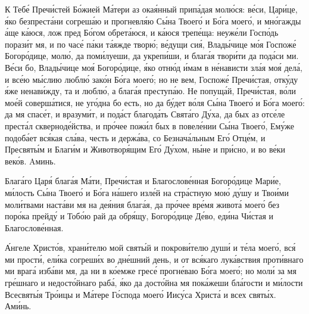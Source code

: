 \begin{mymulticols}
К Теб\'{е} Преч\'{и}стей Б\'{о}жией М\'{а}тери аз ока\'{я}нный прип\'{а}дая мол\'{ю}ся: в\'{е}си, Цар\'{и}це, \'{я}ко безпрест\'{а}ни согреш\'{а}ю и прогневл\'{я}ю С\'{ы}на Твоег\'{о} и Б\'{о}га моег\'{о}, и мн\'{о}гажды \'{а}ще к\'{а}юся, лож пред Б\'{о}гом обрет\'{а}юся, и к\'{а}юся треп\'{е}ща: неуж\'{е}ли Госп\'{о}дь пораз\'{и}т мя, и по час\'{е} п\'{а}ки т\'{а}яжде твор\'{ю}; в\'{е}дущи си\'{я}, Влад\'{ы}чице м\'{о}я Госпож\'{е} Богор\'{о}дице, мол\'{ю}, да пом\'{и}луеши, да укреп\'{и}ши, и благ\'{а}я твор\'{и}ти да под\'{а}си ми. В\'{е}си бо, Влад\'{ы}чице мо\'{я} Богор\'{о}дице, \'{я}ко отн\'{ю}д \'{и}мам в н\'{е}нависти зл\'{а}я мо\'{я} дел\'{а}, и вс\'{е}ю м\'{ы}слию любл\'{ю} зак\'{о}н Б\'{о}га моег\'{о}; но не вем, Госпож\'{е} Преч\'{и}стая, отк\'{у}ду \'{я}же ненав\'{и}жду, та и любл\'{ю}, а благ\'{а}я преступ\'{а}ю. Не попущ\'{а}й, Преч\'{и}стая, в\'{о}ли мо\'{е}й соверш\'{а}тися, не уг\'{о}дна бо есть, но да б\'{у}дет в\'{о}ля С\'{ы}на Твоег\'{о} и Б\'{о}га моег\'{о}: да мя спас\'{е}т, и вразум\'{и}т, и под\'{а}ст благод\'{а}ть Свят\'{а}го Д\'{у}ха, да бых аз отс\'{е}ле прест\'{а}л сквернод\'{е}йства, и пр\'{о}чее пож\'{и}л бых в повел\'{е}нии С\'{ы}на Твоег\'{о}, Ем\'{у}же подоб\'{а}ет вс\'{я}кая сл\'{а}ва, честь и держ\'{а}ва, со Безнач\'{а}льным Ег\'{о} Отц\'{е}м, и Пресвят\'{ы}м и Благ\'{и}м и Животвор\'{я}щим Ег\'{о} Д\'{у}хом, н\'{ы}не и пр\'{и}сно, и во в\'{е}ки век\'{о}в. Aминь.


Благ\'{а}го Цар\'{я} благ\'{а}я М\'{а}ти, Преч\'{и}стая и Благослов\'{е}нная Богор\'{о}дице Мар\'{и}е, м\'{и}лость С\'{ы}на Твоег\'{о} и Б\'{о}га н\'{а}шего изл\'{е}й на стр\'{а}стную мо\'{ю} д\'{у}шу и Тво\'{и}ми мол\'{и}твами наст\'{а}ви мя на де\'{я}ния благ\'{а}я, да пр\'{о}чее вр\'{е}мя живот\'{а} моег\'{о} без пор\'{о}ка прейд\'{у} и Тоб\'{о}ю рай да обр\'{я}щу, Богор\'{о}дице Д\'{е}во, ед\'{и}на Ч\'{и}стая и Благослов\'{е}нная.


\'{А}нгеле Христ\'{о}в, хран\'{и}телю мой свят\'{ы}й и покров\'{и}телю душ\'{и} и т\'{е}ла моег\'{о}, вс\'{я} ми прост\'{и}, ел\'{и}ка согреш\'{и}х во дн\'{е}шний день, и от вс\'{я}каго лук\'{а}вствия прот\'{и}внаго ми враг\'{а} изб\'{а}ви мя, да ни в к\'{о}емже грес\'{е} прогн\'{е}ваю Б\'{о}га моег\'{о}; но мол\'{и} за мя гр\'{е}шнаго и недост\'{о}йнаго раб\'{а}, \'{я}ко да дост\'{о}йна мя пок\'{а}жеши бл\'{а}гости и м\'{и}лости Всесвят\'{ы}я Тр\'{о}ицы и М\'{а}тере Г\'{о}спода моег\'{о} Иис\'{у}са Христ\'{а} и всех свят\'{ы}х. Ам\'{и}нь.


\end{mymulticols}
